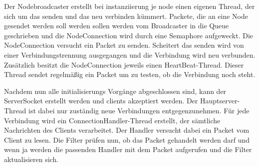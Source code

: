 \documentclass[a4paper]{article}
\theoremstyle{definition}
\begin{document}
    Der Nodebroadcaster erstellt bei instanziierung je node einen eigenen Thread, der sich um das senden und das neu verbinden kümmert.
    Packete, die an eine Node gesendet werden soll werden sollen werden vom Broadcaster in die Queue geschrieben und die NodeConnection wird durch eine Semaphore aufgeweckt. Die NodeConnection versucht ein Packet zu senden. Scheitert das senden wird von einer Verbindungstrennung ausgegangen und die Verbindung wird neu verbunden.
    Zusätzlich besitzt die NodeConnection jeweils einen HeartBeat-Thread. Dieser Thread sendet regelmäßig ein Packet um zu testen, ob die Verbindung noch steht.

    Nachdem nun alle initialisierungs Vorgänge abgeschlossen sind, kann der ServerSocket erstellt werden und clients akzeptiert werden.
    Der Hauptserver-Thread ist dabei nur zuständig neue Verbindungen entgegenzunehmen. Für jede Verbindung wird ein ConnectionHandler-Thread erstellt, der sämtliche Nachrichten des Clients verarbeitet. Der Handler versucht dabei ein Packet vom Client zu lesen. Die Filter prüfen nun, ob das Packet gehandelt werden darf und wenn ja werden die passenden Handler mit dem Packet aufgerufen und die Filter aktualisieren sich.
\end{document}
